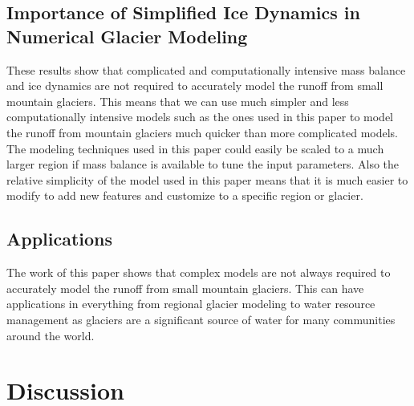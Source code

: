 \documentclass{article}
\begin{document}
\subsection{Importance of Simplified Ice Dynamics in Numerical Glacier Modeling}
These results show that complicated and computationally intensive mass balance and ice dynamics are not required to accurately model the 
runoff from small mountain glaciers. This means that we can use much simpler and less computationally intensive models such as the ones used 
in this paper to model the runoff from mountain glaciers much quicker than more complicated models. The modeling techniques used in this paper could easily be 
scaled to a much larger region if mass balance is available to tune the input parameters. Also the relative simplicity of the model used in 
this paper means that it is much easier to modify to add new features and customize to a specific region or glacier.

\subsection{Applications}
The work of this paper shows that complex models are not always required to accurately model the runoff from small mountain glaciers. This 
can have applications in everything from regional glacier modeling to water resource management as glaciers are a significant source of water 
for many communities around the world. 

\section{Discussion}
\end{document}

